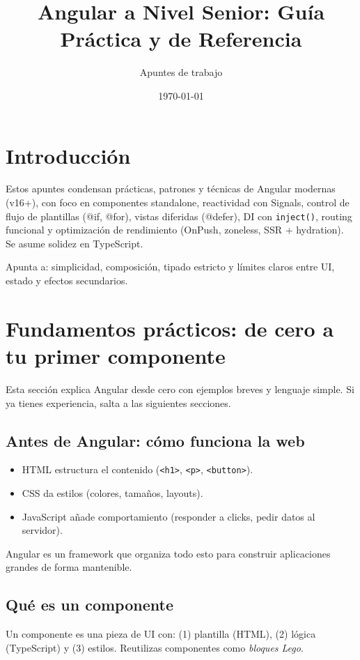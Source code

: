 \documentclass[11pt,a4paper]{article}
\title{Angular a Nivel Senior: Guía Práctica y de Referencia}
\author{Apuntes de trabajo}
\date{\today}
\begin{document}
\maketitle
\tableofcontents
\newpage

\section{Introducción}
Estos apuntes condensan prácticas, patrones y técnicas de Angular modernas (v16+), con foco en componentes standalone, reactividad con Signals, control de flujo de plantillas (@if, @for), vistas diferidas (@defer), DI con \texttt{inject()}, routing funcional y optimización de rendimiento (OnPush, zoneless, SSR + hydration). Se asume solidez en TypeScript.

\begin{tipbox}
Apunta a: simplicidad, composición, tipado estricto y límites claros entre UI, estado y efectos secundarios.
\end{tipbox}

\section{Fundamentos prácticos: de cero a tu primer componente}
Esta sección explica Angular desde cero con ejemplos breves y lenguaje simple. Si ya tienes experiencia, salta a las siguientes secciones.

\subsection{Antes de Angular: cómo funciona la web}
\begin{itemize}[leftmargin=*]
  \item HTML estructura el contenido (\texttt{<h1>}, \texttt{<p>}, \texttt{<button>}).
  \item CSS da estilos (colores, tamaños, layouts).
  \item JavaScript añade comportamiento (responder a clicks, pedir datos al servidor).
\end{itemize}
Angular es un framework que organiza todo esto para construir aplicaciones grandes de forma mantenible.

\subsection{Qué es un componente}
Un componente es una pieza de UI con: (1) plantilla (HTML), (2) lógica (TypeScript) y (3) estilos. Reutilizas componentes como \emph{bloques Lego}.
\end{document}
